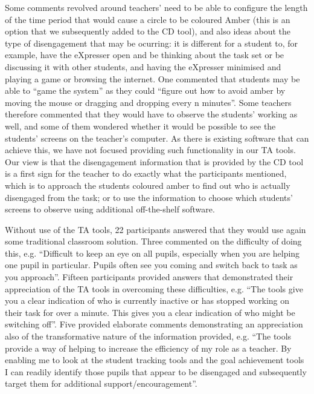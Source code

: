 {{Some comments revolved around
teachers' need to be able to configure the length of the time period 
that would cause a circle to be coloured Amber
(this is an option that we subsequently added to the CD tool), 
and also ideas about the type of
disengagement that may be ocurring: it is different for a student to, for example, 
have the eXpresser open and be thinking about the task set or be discussing 
it with other students, and having the eXpresser minimised and playing 
a game or browsing the internet. 
%
%
One commented that students may be able to ``game the system'' as they 
could ``figure out how to avoid amber by moving the mouse or dragging and 
dropping every n minutes''.   
Some teachers therefore commented that they would have
to observe the students' working as well, and some of them 
wondered whether it would be possible to see 
the students' screens on the teacher's computer. 
As there is existing software that can achieve this, we have not focused 
providing such functionality in our TA tools. 
Our view is that the disengagement information that is provided by the CD tool 
is a first sign for the teacher to do exactly what the 
participants mentioned, which is to approach the students coloured amber 
to find out who is actually disengaged from the task; 
or to use the information to choose which students' screens to observe
using additional off-the-shelf software. 

Without use of the TA tools, 22 participants
answered that they would use again some traditional
classroom solution.
Three commented on the difficulty of doing this, e.g. 
``Difficult to keep an eye on all pupils, especially when you are
helping one pupil in particular. Pupils often see you coming and
switch back to task as you approach''. 
Fifteen participants provided answers that demonstrated their appreciation of the 
TA tools in overcoming these difficulties, e.g. ``The tools give you a clear
indication of who is currently inactive or has stopped working on
their task for over a minute. This gives you a clear indication of who
might be switching off''. 
Five provided elaborate comments
demonstrating an appreciation also of the transformative nature
of the information provided, e.g. ``The tools provide a way of helping to
increase the efficiency of my role as a teacher. By enabling me to
look at the student tracking tools and the goal achievement tools I
can readily identify those pupils that appear to be disengaged and
subsequently target them for additional support/encouragement''. 



}}
